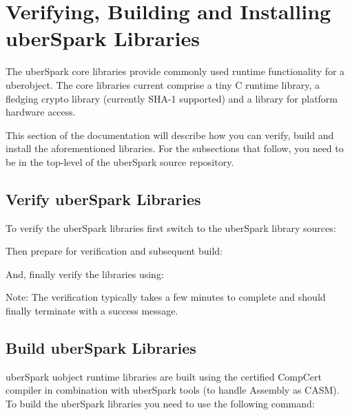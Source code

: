 \documentclass[letterpaper,10pt,english]{sphinxmanual}
\begin{document}
\chapter{Verifying, Building and Installing uberSpark Libraries}
\label{\detokenize{verify-build-install-libs:verifying-building-and-installing-uberspark-libraries}}\label{\detokenize{verify-build-install-libs::doc}}
The uberSpark core libraries provide commonly used runtime functionality
for a uberobject. The core libraries current comprise a tiny C runtime
library, a fledging crypto library (currently SHA-1 supported) and a
library for platform hardware access.

This section of the documentation will describe how you
can verify, build and install the aforementioned libraries. For the
subsections that follow, you need to be in the top-level of the
uberSpark source repository.


\section{Verify uberSpark Libraries}
\label{\detokenize{verify-build-install-libs:verify-uberspark-libraries}}
To verify the uberSpark libraries first switch to the uberSpark
library sources:

\begin{sphinxVerbatim}[commandchars=\\\{\}]
 
\end{sphinxVerbatim}

Then prepare for verification and subsequent build:

\begin{sphinxVerbatim}[commandchars=\\\{\}]
\end{sphinxVerbatim}

And, finally verify the libraries using:

\begin{sphinxVerbatim}[commandchars=\\\{\}]
 
\end{sphinxVerbatim}

Note: The verification typically takes a few minutes to complete and should finally
terminate with a success message.


\section{Build uberSpark Libraries}
\label{\detokenize{verify-build-install-libs:build-uberspark-libraries}}
uberSpark uobject runtime libraries are built using the certified CompCert compiler
in combination with uberSpark tools (to handle Assembly as CASM). To build the
uberSpark libraries you need to use the following command:
\end{document}
